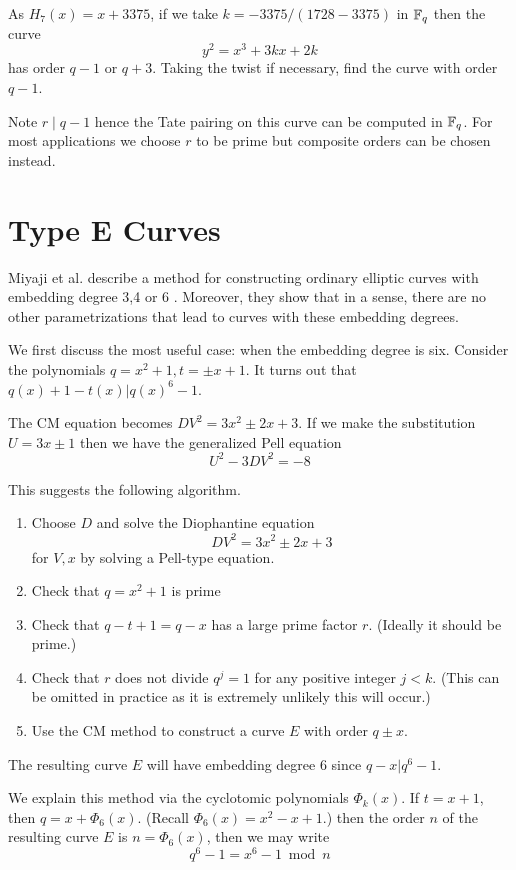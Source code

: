 As $H_7(x) = x + 3375$, if we take $k = -3375 / (1728 - 3375)$ in $\mathbb{F}_q$
then the curve
\[
y^2 = x^3 + 3k x + 2k
\]
has order $q - 1$ or $q + 3$. Taking the twist if necessary,
find the curve with order $q-1$.

Note $r \mid q-1$ hence the Tate pairing on this curve can be computed
in $\mathbb{F}_q$. For most applications we choose $r$ to be prime but composite
orders can be chosen instead.

\section { Type E Curves }

Miyaji et al. describe a method for constructing ordinary elliptic
curves with embedding degree 3,4 or 6 \cite{mnt}. Moreover, they show
that in a sense, there are no other parametrizations that lead to curves
with these embedding degrees.

We first discuss the most useful case: when the embedding degree is six.
Consider the polynomials $q = x^2 + 1, t = \pm x + 1$.
It turns out that $q(x) + 1 - t(x) | q(x)^6 - 1$.

The CM equation becomes $D V^2 = 3 x^2 \pm 2 x + 3$. If we make
the substitution $U = 3x \pm 1$ then we have the generalized Pell equation
\[
U^2 - 3DV^2 = -8
\]

This suggests the following algorithm.

\begin{enumerate}
\item
Choose $D$ and solve the Diophantine equation
\[ D V^2 = 3 x^2 \pm 2 x + 3 \]
for $V, x$ by solving a Pell-type equation.
\item
Check that $q = x^2 + 1$ is prime
\item
Check that $q - t + 1 = q - x$ has a large prime factor $r$.
(Ideally it should be prime.)
\item
Check that $r$ does not divide $q^j = 1$ for any positive integer $j < k$.
(This can be omitted in practice as it is extremely unlikely this will
occur.)
\item
Use the CM method to construct a curve $E$ with order $q \pm x$.
\end{enumerate}

The resulting curve $E$ will have embedding degree 6 since
$q-x | q^6 -1$.

We explain this method via the cyclotomic polynomials $\Phi_k(x)$.
If $t = x + 1$,
then $q = x + \Phi_6(x)$. (Recall $\Phi_6(x) = x^2 - x + 1$.)
then the order $n$ of the resulting
curve $E$ is $n = \Phi_6(x)$, then we may write
\[ q^6 - 1 = x^6 - 1 \bmod n \]

